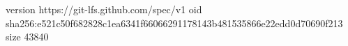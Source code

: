version https://git-lfs.github.com/spec/v1
oid sha256:e521c50f682828c1ea6341f66066291178143b481535866e22edd0d70690f213
size 43840
